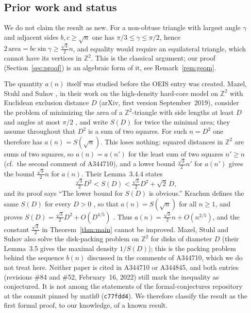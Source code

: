 \documentclass[11pt]{amsart}
\theoremstyle{plain}
\theoremstyle{definition}
\newcommand{\Z}{\mathbb{Z}}
\begin{document}
\subsection*{Prior work and status}
We do not claim the result as new.
For a non-obtuse triangle with largest angle $\gamma$ and adjacent sides $b,c\ge\sqrt n$ one has $\pi/3\le\gamma\le\pi/2$, hence $2\,\mathrm{area}=bc\sin\gamma\ge\frac{\sqrt3}{2}n$, and equality would require an equilateral triangle, which cannot have its vertices in $\Z^2$. This is the classical argument; our proof (Section~\ref{sec:proof}) is an algebraic form of it, see Remark~\ref{rem:geom}.

The quantity $a(n)$ itself was studied before the OEIS entry was created.
Mazel, Stuhl and Suhov \cite{MSS}, in their work on the high-density hard-core model on $\Z^2$ with Euclidean exclusion distance $D$ (arXiv, first version September~2019), consider the problem of minimizing the area of a $\Z^2$-triangle with side lengths at least $D$ and angles at most $\pi/2$ \cite[(2.1)]{MSS}, and write $S(D)$ for twice the minimal area; they assume throughout that $D^2$ is a sum of two squares. For such $n=D^2$ one therefore has $a(n)=S(\sqrt n)$. This loses nothing: squared distances in $\Z^2$ are sums of two squares, so $a(n)=a(n')$ for the least sum of two squares $n'\ge n$ (cf.\ the second comment of A344710), and a lower bound $\frac{\sqrt3}{2}n'$ for $a(n')$ gives the bound $\frac{\sqrt3}{2}n$ for $a(n)$.
Their Lemma~3.4.4 states
\[
  \tfrac{\sqrt3}{2}D^2<S(D)<\tfrac{\sqrt3}{2}D^2+\sqrt2\,D,
\]
and its proof says ``The lower bound for $S(D)$ is obvious.''
Krachun \cite{Kr} defines the same $S(D)$ for every $D>0$ \cite[Definition~2.1]{Kr}, so that $a(n)=S(\sqrt n)$ for all $n\ge1$, and proves $S(D)=\frac{\sqrt3}{2}D^2+O(D^{4/5})$ \cite[Theorem~2]{Kr}. Thus $a(n)=\frac{\sqrt3}{2}n+O(n^{2/5})$, and the constant $\frac{\sqrt3}{2}$ in Theorem~\ref{thm:main} cannot be improved.
Mazel, Stuhl and Suhov also solve the disk-packing problem on $\Z^2$ for disks of diameter $D$ (their Lemma~3.5 gives the maximal density $1/S(D)$); this is the packing problem behind the sequence $b(n)$ discussed in the comments of A344710, which we do not treat here.
Neither paper is cited in A344710 or A344845, and both entries (revisions \#84 and \#52, February~16, 2022) still mark the inequality as conjectured. It is not among the statements of the formal-conjectures repository \cite{FC} at the commit pinned by math0 (\texttt{c77fdd4}).
We therefore classify the result as the first formal proof, to our knowledge, of a known result.
\end{document}
